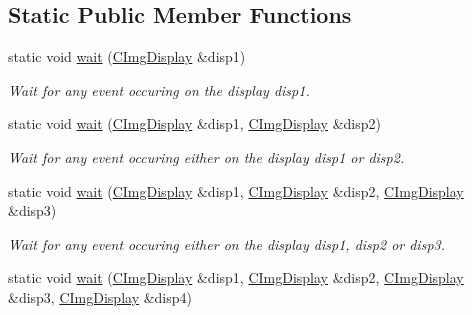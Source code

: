 \subsection*{Static Public Member Functions}
\begin{DoxyCompactItemize}
\item 
\hypertarget{structcimg__library_1_1_c_img_display_a8c2bf618661c56a0738ffdfa8f59e247}{static void \hyperlink{structcimg__library_1_1_c_img_display_a8c2bf618661c56a0738ffdfa8f59e247}{wait} (\hyperlink{structcimg__library_1_1_c_img_display}{C\-Img\-Display} \&disp1)}\label{structcimg__library_1_1_c_img_display_a8c2bf618661c56a0738ffdfa8f59e247}

\begin{DoxyCompactList}\small\item\em Wait for any event occuring on the display {\ttfamily disp1}. \end{DoxyCompactList}\item 
\hypertarget{structcimg__library_1_1_c_img_display_af9d487817a273facc7e0152c2a9b03e8}{static void \hyperlink{structcimg__library_1_1_c_img_display_af9d487817a273facc7e0152c2a9b03e8}{wait} (\hyperlink{structcimg__library_1_1_c_img_display}{C\-Img\-Display} \&disp1, \hyperlink{structcimg__library_1_1_c_img_display}{C\-Img\-Display} \&disp2)}\label{structcimg__library_1_1_c_img_display_af9d487817a273facc7e0152c2a9b03e8}

\begin{DoxyCompactList}\small\item\em Wait for any event occuring either on the display {\ttfamily disp1} or {\ttfamily disp2}. \end{DoxyCompactList}\item 
\hypertarget{structcimg__library_1_1_c_img_display_a0e800e61def1cc90892386890c691330}{static void \hyperlink{structcimg__library_1_1_c_img_display_a0e800e61def1cc90892386890c691330}{wait} (\hyperlink{structcimg__library_1_1_c_img_display}{C\-Img\-Display} \&disp1, \hyperlink{structcimg__library_1_1_c_img_display}{C\-Img\-Display} \&disp2, \hyperlink{structcimg__library_1_1_c_img_display}{C\-Img\-Display} \&disp3)}\label{structcimg__library_1_1_c_img_display_a0e800e61def1cc90892386890c691330}

\begin{DoxyCompactList}\small\item\em Wait for any event occuring either on the display {\ttfamily disp1}, {\ttfamily disp2} or {\ttfamily disp3}. \end{DoxyCompactList}\item 
\hypertarget{structcimg__library_1_1_c_img_display_a3b25b3b7b2d3021c4ce57174e423e6f3}{static void \hyperlink{structcimg__library_1_1_c_img_display_a3b25b3b7b2d3021c4ce57174e423e6f3}{wait} (\hyperlink{structcimg__library_1_1_c_img_display}{C\-Img\-Display} \&disp1, \hyperlink{structcimg__library_1_1_c_img_display}{C\-Img\-Display} \&disp2, \hyperlink{structcimg__library_1_1_c_img_display}{C\-Img\-Display} \&disp3, \hyperlink{structcimg__library_1_1_c_img_display}{C\-Img\-Display} \&disp4)}\label{structcimg__library_1_1_c_img_display_a3b25b3b7b2d3021c4ce57174e423e6f3}


\end{DoxyCompactItemize}
